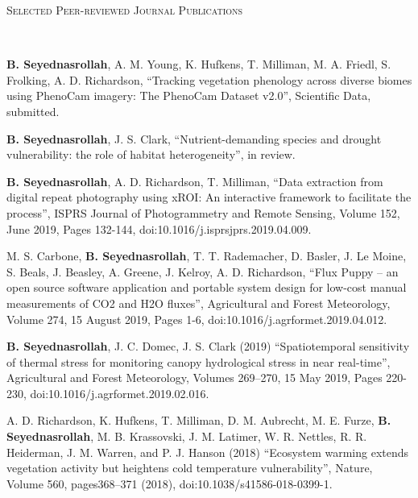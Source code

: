 \documentclass[10pt]{article}
\newenvironment{changemargin}[2]{%
  \begin{list}{}{%
 \setlength{\topsep}{0pt}%
 \setlength{\leftmargin}{#1}%
 \setlength{\rightmargin}{#2}%
 \setlength{\listparindent}{\parindent}%
 \setlength{\itemindent}{\parindent}%
 \setlength{\parsep}{\parskip}%
  }%
  \item[]}{\end{list}
}
\newcommand{\lineover}{
  \begin{changemargin}{-0.05in}{-0.05in}
  \vspace*{-8pt}
  \hrulefill \\
  \vspace*{-2pt}
  \end{changemargin}
}
\newcommand{\header}[1]{
  \begin{changemargin}{-0.5in}{-0.5in}
  \scshape{#1}\\
  \lineover
  \end{changemargin}
}
\newenvironment{body} {
  \vspace*{-2pt}
  \begin{changemargin}{-0.5in}{-0.5in}
}
{\end{changemargin}
}
\begin{document}
\medskip
\header{Selected Peer-reviewed Journal Publications}

\begin{body}
  \begin{etaremune}

    \item  \textbf{B. Seyednasrollah}, A. M. Young, K. Hufkens, T. Milliman, M. A. Friedl, S. Frolking, A. D. Richardson, ``Tracking vegetation phenology across diverse biomes using PhenoCam imagery: The PhenoCam Dataset v2.0'', Scientific Data, submitted.\\
    \medskip

    \item \textbf{B. Seyednasrollah}, J. S. Clark, ``Nutrient-demanding species and drought vulnerability: the role of habitat heterogeneity'', in review.\\
    \medskip

    \item \textbf{B. Seyednasrollah}, A. D. Richardson, T. Milliman, ``Data extraction from digital repeat photography using xROI: An interactive framework to facilitate the process'', ISPRS Journal of Photogrammetry and Remote Sensing, Volume 152, June 2019, Pages 132-144, doi:10.1016/j.isprsjprs.2019.04.009.\\
    \medskip

    \item M. S. Carbone, \textbf{B. Seyednasrollah}, T. T. Rademacher, D. Basler, J. Le Moine, S. Beals, J. Beasley, A. Greene, J. Kelroy, A. D. Richardson, ``Flux Puppy – an open source software application and portable system design for low-cost manual measurements of CO2 and H2O fluxes'', Agricultural and Forest Meteorology, Volume 274, 15 August 2019, Pages 1-6, doi:10.1016/j.agrformet.2019.04.012.\\
    \medskip


    \item \textbf{B. Seyednasrollah}, J. C. Domec, J. S. Clark (2019) ``Spatiotemporal sensitivity of thermal stress for monitoring canopy hydrological stress in near real-time'', Agricultural and Forest Meteorology, Volumes 269–270, 15 May 2019, Pages 220-230, doi:10.1016/j.agrformet.2019.02.016.\\
    \medskip

    \item A. D. Richardson, K. Hufkens, T. Milliman, D. M. Aubrecht, M. E. Furze, \textbf{B. Seyednasrollah}, M. B. Krassovski, J. M. Latimer, W. R. Nettles, R. R. Heiderman, J. M. Warren, and P. J. Hanson (2018) ``Ecosystem warming extends vegetation activity but heightens cold temperature vulnerability'', Nature, Volume 560, pages368–371 (2018), doi:10.1038/s41586-018-0399-1.\\
    \medskip


\end{etaremune}
\end{body}
\end{document}
